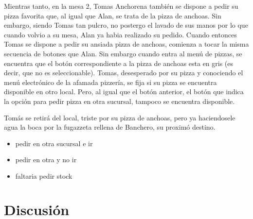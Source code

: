 \documentclass[a4paper,10pt]{article}
\begin{document}
Mientras tanto, en la mesa 2, Tomas Anchorena tambi\'en se dispone a pedir su pizza favorita que, al igual que Alan, se trata de la pizza de 
anchoas. Sin embargo, siendo Tomas tan pulcro, no postergo el lavado de sus manos por lo que cuando volvio a su mesa, Alan ya habia realizado
su pedido. Cuando entonces Tomas se dispone a pedir su ansiada pizza de anchoas, comienza a tocar la misma secuencia de botones que Alan. Sin embargo
cuando entra al men\'u de pizzas, se encuentra que el bot\'on correspondiente a la pizza de anchoas esta en gris (es decir, que no es seleccionable).
Tomas, desesperado por su pizza y conociendo el men\'u electr\'onico de la afamada pizzer\'ia, se fija si su pizza se encuentra disponible en otro
local. Pero, al igual que el bot\'on anterior, el bot\'on que indica la opci\'on para pedir pizza en otra sucursal, tampoco se encuentra disponible.

Tom\'as se retir\'a del local, triste por su pizza de anchoas, pero ya haciendosele agua la boca por la fugazzeta rellena de Banchero, su proxim\'o destino.

 
\begin{itemize}
\item pedir en otra sucursal e ir
\item pedir en otra y no ir
\item faltaria pedir stock
\end{itemize}


\newpage
\section*{Discusi\'on}
\end{document}

